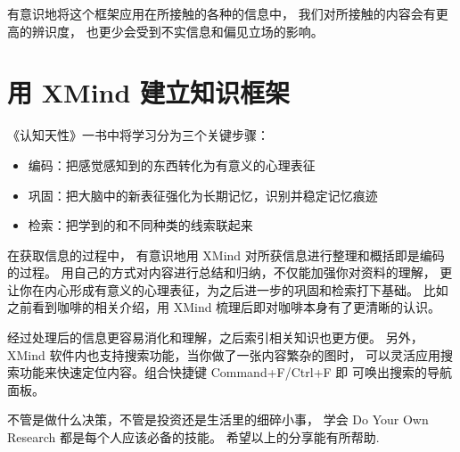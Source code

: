 \documentclass[../main.tex]{subfiles}
\begin{document}
有意识地将这个框架应用在所接触的各种的信息中，
我们对所接触的内容会有更高的辨识度，
也更少会受到不实信息和偏见立场的影响。
%
\section{用 XMind 建立知识框架}
《认知天性》一书中将学习分为三个关键步骤：
%
\begin{itemize}
  \item 编码：把感觉感知到的东西转化为有意义的心理表征
  \item 巩固：把大脑中的新表征强化为长期记忆，识别并稳定记忆痕迹
  \item 检索：把学到的和不同种类的线索联起来
\end{itemize}
%
在获取信息的过程中，
有意识地用 XMind 对所获信息进行整理和概括即是编码的过程。
用自己的方式对内容进行总结和归纳，不仅能加强你对资料的理解，
更让你在内心形成有意义的心理表征，为之后进一步的巩固和检索打下基础。
比如之前看到咖啡的相关介绍，用 XMind 梳理后即对咖啡本身有了更清晰的认识。

经过处理后的信息更容易消化和理解，之后索引相关知识也更方便。
另外，XMind 软件内也支持搜索功能，当你做了一张内容繁杂的图时，
可以灵活应用搜索功能来快速定位内容。组合快捷键 Command+F/Ctrl+F 即
可唤出搜索的导航面板。

不管是做什么决策，不管是投资还是生活里的细碎小事，
学会 Do Your Own Research 都是每个人应该必备的技能。
希望以上的分享能有所帮助.
%
\end{document}
